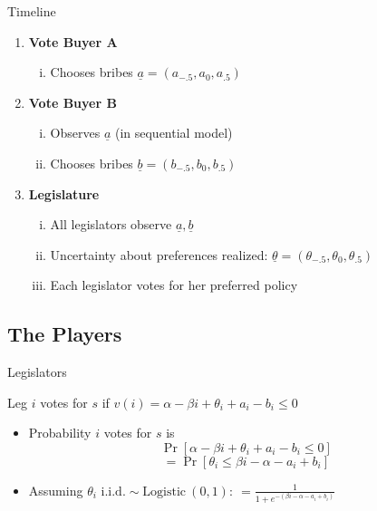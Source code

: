 \documentclass{beamer}
\newcommand{\ta}{\theta}
\newcommand{\un}{\underline}
\begin{document}
\begin{frame}{Timeline}
\pause
\begin{enumerate}[<+->]
	\item {\bfseries Vote Buyer A}
		\begin{enumerate}[i.]
			\item Chooses bribes $\un{a} = \left(a_{-.5},a_0,a_{.5}\right)$
		\end{enumerate}
	\item \textbf{Vote Buyer B}
		\begin{enumerate}[i.]
			\item Observes $\un{a}$ (in sequential model)
			\item Chooses bribes $\un{b} = \left(b_{-.5},b_0,b_{.5}\right)$
		\end{enumerate}
	\item \textbf{Legislature}
		\begin{enumerate}[i.]
			\item All legislators observe $\un{a},\un{b}$
			\item Uncertainty about preferences realized: $\un{\ta} = \left(\ta_{-.5},\ta_0,\ta_{.5}\right)$
			\item Each legislator votes for her preferred policy 
		\end{enumerate}
\end{enumerate}
\end{frame}


\subsection{The Players}

\begin{frame}{Legislators}

\pause
Leg $i$ votes for $s$ if $v(i) = \alpha -\beta i + \ta_i + a_i - b_i \leq 0$
\pause
	\begin{itemize}[<+->]
		\item Probability $i$ votes for $s$ is
		\pause
			\[ 
				\Pr\left[\alpha -\beta i + \ta_i + a_i - b_i \leq 0 \right]
			\]
		\pause
			\[
				= \Pr\left[\ta_i \leq \beta i - \alpha - a_i + b_i \right]
			\]
		\pause
		\item Assuming $\ta_i \text{ i.i.d.} \sim \text{Logistic} \ (0,1): \ = \frac{1}{1+e^{-\left(\beta i - \alpha - a_i + b_i \right)}}$ 
	\end{itemize}
\end{frame}
\end{document}
